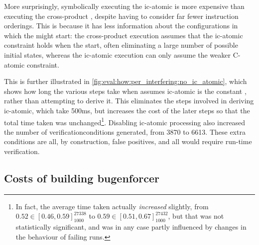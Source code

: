 More surprisingly, symbolically executing the \gls{ic-atomic}
{\StateMachine} is more expensive than executing the cross-product
{\StateMachine}, despite having to consider far fewer instruction
orderings.  This is because it has less information about the
configurations in which the {\StateMachines} might start: the
cross-product execution assumes that the \gls{ic-atomic} constraint
holds when the {\StateMachines} start, often eliminating a large
number of possible initial states, whereas the \gls{ic-atomic}
execution can only assume the weaker C-atomic constraint.

\begin{sanefig}
  \caption{Time taken by per-\gls{interferingthread} analysis steps,
    with the \gls{ic-atomic} steps disabled.}
  \label{fig:eval:how:per_interfering:no_ic_atomic}
\end{sanefig}

This is further illustrated in
\autoref{fig:eval:how:per_interfering:no_ic_atomic}, which shows how
long the various steps take when {\technique} assumes \gls{ic-atomic}
is the constant \true, rather than attempting to derive it.  This
eliminates the steps involved in deriving \gls{ic-atomic}, which take
500ms, but increases the cost of the later steps so that the total
time taken was unchanged\footnote{In fact, the average time taken
  actually \emph{increased} slightly, from $0.52 \in [0.46,
    0.59]_{1000}^{27338}$ to $0.59 \in [0.51, 0.67]_{1000}^{27432}$,
  but that was not statistically significant, and was in any case
  partly influenced by changes in the behaviour of failing runs.}.
Disabling \gls{ic-atomic} processing also increased the number of
\glspl{verificationcondition} generated, from 3870 to 6613.  These
extra conditions are all, by construction, false positives, and all
would require run-time verification.  

\subsection{Costs of building \gls{bugenforcer}}

\begin{sanefig}
  \caption{Time taken to convert the 3870
    \glspl{verificationcondition} generated by the experiments in
    \autoref{sect:eval:how:per_interfering} into \glspl{bugenforcer}.
    All of the failures were caused by running out of memory; there
    were no timeouts during this experiment.}
  \label{fig:eval:how:build_enforcer}
\end{sanefig}

